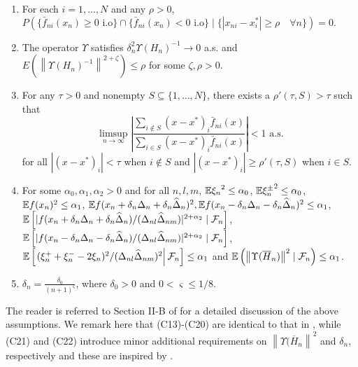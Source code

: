 \documentclass[twocolumn]{IEEEtran}
\begin{document}
\begin{enumerate}[label=(\textbf{C\arabic*}),resume]
\item For each $i=1,\ldots,N$ and any $\rho>0$, 
$P(\{ \bar f_{ni} (x_n) \ge 0 \text{ i.o}\} \cap \{ \bar f_{ni} (x_n) < 0 \text{ i.o}\} \mid \{ |x_{ni} - x^*_i| \ge \rho\quad \forall n\}) =0.$

\item The operator $\Upsilon$ satisfies $\delta_n^2 \Upsilon(H_n)^{-1} \rightarrow 0$ a.s. and  $E(\left\| \Upsilon(H_n)^{-1}\right\|^{2+\zeta}) \le \rho$ for some $\zeta, \rho>0$.

\item For any $\tau >0$ and nonempty $S \subseteq \{1,\ldots,N\}$, there exists a $\rho'(\tau,S)>\tau$ such that 
$$ \limsup_{n\rightarrow \infty} \left| \dfrac{\sum_{i \notin S} (x-x^*)_i \bar f_{ni}(x)}{\sum_{i \in S} (x-x^*)_i \bar f_{ni}(x)}               \right| < 1 \text{ a.s.}$$
for all $|(x-x^*)_i| < \tau$ when $i \notin S$ and $|(x-x^*)_i| \ge \rho'(\tau,S)$ when $i\in S$.
\item For some $\alpha_0, \alpha_1, \alpha_2 >0$ and for all $n,l,m$, $\mathbb{E} {\xi_n}^{2} \le \alpha_0$, $\mathbb{E} {\xi_n^{\pm}}^{2} \le \alpha_0$, $\mathbb{E} f(x_n)^{2} \le \alpha_1$,  $\mathbb{E} f(x_n + \delta_n \Delta_n + \delta_n \widehat \Delta_n)^{2},\mathbb{E} f(x_n - \delta_n \Delta_n - \delta_n \widehat \Delta_n)^{2} \le \alpha_1$, 
$\mathbb{E} \left[| f(x_n + \delta_n \Delta_n + \delta_n \widehat \Delta_n)/ (\Delta_{nl}\widehat\Delta_{nm})|^{2+\alpha_2} \mid \mathcal{F}_n\right]$,
$\mathbb{E} \left[ |f(x_n - \delta_n \Delta_n - \delta_n \widehat \Delta_n)/ (\Delta_{nl}\widehat\Delta_{nm})|^{2+\alpha_2} \mid \mathcal{F}_n\right]$,
 $\mathbb{E}\left[\left. (\xi_n^+ + \xi_n^- - 2 \xi_n)^2/(\Delta_{nl}\widehat\Delta_{nm})^2 \right| \mathcal{F}_n \right] \le \alpha_1$ 
and $\mathbb{E} \left(\left\| \Upsilon(\overline H_n) \right\|^2 \mid \mathcal{F}_n\right) \le \alpha_1$. 
\item  $\delta_n = \frac{\delta_0}{(n+1)^{\varsigma}}$, where $\delta_0 > 0$ and $0 < \varsigma \le 1/8$.
\end{enumerate}
The reader is referred to Section II-B of \cite{prashanth2015rdsa} for a detailed discussion of the above assumptions. We remark here that (C13)-(C20) are identical to that in \cite{prashanth2015rdsa}, while (C21) and (C22) introduce minor additional requirements on $\left\| \Upsilon(\overline H_n \right\|^2$ and $\delta_n$, respectively and these are inspired by \cite{spall-jacobian}.
\end{document}
